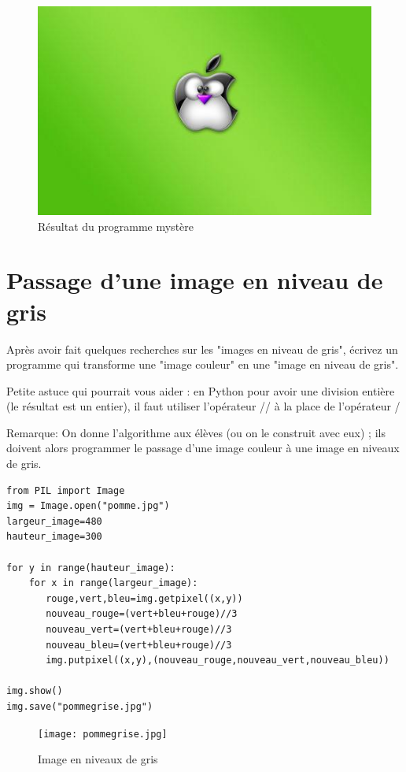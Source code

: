 \documentclass[11pt]{article}
\begin{document}
\begin{figure}[htbp]
\centering
\includegraphics[width=.9\linewidth]{pommeMystere.jpg}
\caption{Résultat du programme mystère}
\end{figure}


\section{Passage d'une image en niveau de gris}
\label{sec:org7bb459f}

Après avoir fait quelques recherches sur les "images en niveau de gris", écrivez un programme qui transforme une "image couleur" en une "image en niveau de gris".

Petite astuce qui pourrait vous aider : en Python pour avoir une division entière (le résultat est un entier), il faut utiliser l'opérateur // à la place de l'opérateur / 

Remarque: On donne l'algorithme aux élèves (ou on le construit avec eux) ; ils doivent alors programmer le passage d'une image couleur à une image en niveaux de gris.


\begin{verbatim}
from PIL import Image
img = Image.open("pomme.jpg")
largeur_image=480
hauteur_image=300

for y in range(hauteur_image):
    for x in range(largeur_image):
       rouge,vert,bleu=img.getpixel((x,y))
       nouveau_rouge=(vert+bleu+rouge)//3
       nouveau_vert=(vert+bleu+rouge)//3
       nouveau_bleu=(vert+bleu+rouge)//3
       img.putpixel((x,y),(nouveau_rouge,nouveau_vert,nouveau_bleu))

img.show()
img.save("pommegrise.jpg")
\end{verbatim}

\begin{figure}[htbp]
\centering
\texttt{[image: pommegrise.jpg]}
\caption{Image en niveaux de gris}
\end{figure}
\end{document}
